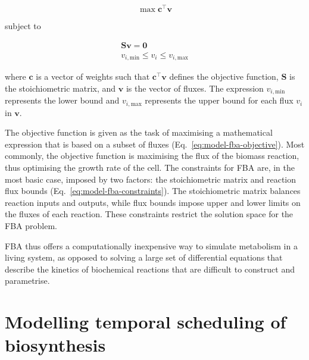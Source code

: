 \begin{equation}
  \max \mathbf{c}^{\intercal} \mathbf{v}
  \label{eq:model-fba-objective}
\end{equation}

subject to

\begin{equation}
  \begin{gathered}
    \mathbf{S} \mathbf{v} = \mathbf{0}\\
    v_{i,\mathrm{min}} \leq v_{i} \leq v_{i,\mathrm{max}}
  \end{gathered}
  \label{eq:model-fba-constraints}
\end{equation}

where $\mathbf{c}$ is a vector of weights such that $\mathbf{c}^{\intercal} \mathbf{v}$ defines the objective function, $\mathbf{S}$ is the stoichiometric matrix, and $\mathbf{v}$ is the vector of fluxes. The expression $v_{i,\mathrm{min}}$ represents the lower bound and $v_{i,\mathrm{max}}$ represents the upper bound for each flux $v_{i}$ in $\mathbf{v}$.

The objective function is given as the task of maximising a mathematical expression that is based on a subset of fluxes (Eq.\ \ref{eq:model-fba-objective}).
Most commonly, the objective function is maximising the flux of the biomass reaction, thus optimising the growth rate of the cell.
The constraints for FBA are, in the most basic case, imposed by two factors:
the stoichiometric matrix and reaction flux bounds (Eq.\ \ref{eq:model-fba-constraints}).
The stoichiometric matrix balances reaction inputs and outputs, while flux bounds impose upper and lower limits on the fluxes of each reaction.
These constraints restrict the solution space for the FBA problem.

FBA thus offers a computationally inexpensive way to simulate metabolism in a living system, as opposed to solving a large set of differential equations that describe the kinetics of biochemical reactions that are difficult to construct and parametrise.

\section{Modelling temporal scheduling of biosynthesis}
\label{sec:model-temporal}

